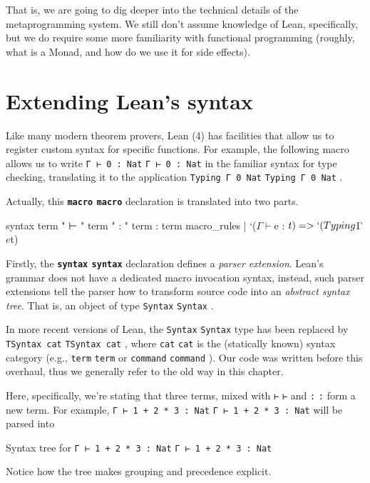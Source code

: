 \documentclass[titlepage]{report}
\newenvironment{remark}{%
\begin{framed}
\begin{trivlist}
    \item[\hskip \labelsep {\bfseries Remark:}]}%
{%
\end{trivlist}%
\end{framed}
}
\newenvironment{todo}{%
\definecolor{shadecolor}{HTML}{F8E0E0}%
\begin{shaded}%
\begin{trivlist}                         
    \item[\hskip \labelsep {\bfseries Todo:}]}{\end{trivlist}\end{shaded}}
\newcommand\lean[1]{%
\ifx\leanmode\undefined%
\def\leanmode{1}%
\texttt{\small #1}%
\undef\leanmode%
\else%
\texttt{#1}%
\fi%
}
\newcommand\keyword[1]{{\color{keywordcolor} \textbf{\lean{#1}}}}
\begin{document}
That is, we are going to dig deeper into the technical details of the metaprogramming system.
We still don't assume knowledge of Lean, specifically, but we do require some more familiarity with functional programming (roughly, what is a Monad, and how do we use it for side effects). \cite{ullrichNotationsHygienicMacro2022}\cite{paulinoMetaprogrammingLean}


\section{Extending Lean's syntax}
\label{sec:syntax}

Like many modern theorem provers, Lean (4) has facilities that allow us to register custom syntax for specific functions. For example, the following macro allows us to write \lean{Γ ⊢ 0 : Nat} in the familiar syntax for type checking, translating it to the application \lean{Typing Γ 0 Nat}.
Actually, this \keyword{macro} declaration is translated into two parts.

\begin{leancode}
    syntax term " ⊢ " term " : " term : term
    macro_rules
      | `($Γ ⊢ $e : $t) => `(Typing $Γ $e $t)
\end{leancode}

Firstly, the \keyword{syntax} declaration defines a \emph{parser extension}.
Lean's grammar does not have a dedicated macro invocation syntax, instead, such parser extensions tell the parser how to transform source code into an \emph{abstract syntax tree}. That is, an object of type \lean{Syntax}.

\begin{remark}
    In more recent versions of Lean, the \lean{Syntax} type has been replaced by \lean{TSyntax cat}, where \lean{cat} is the (statically known) syntax category (e.g., \lean{term} or \lean{command}).
    Our code was written before this overhaul, thus we generally refer to the old way in this chapter.
\end{remark}


Here, specifically, we're stating that three terms, mixed with \lean{⊢} and \lean{:} form a new term. For example, \lean{Γ ⊢ 1 + 2 * 3 : Nat} will be parsed into
\begin{todo}
    Syntax tree for \lean{Γ ⊢ 1 + 2 * 3 : Nat}
\end{todo}
Notice how the tree makes grouping and precedence explicit.
\end{document}
